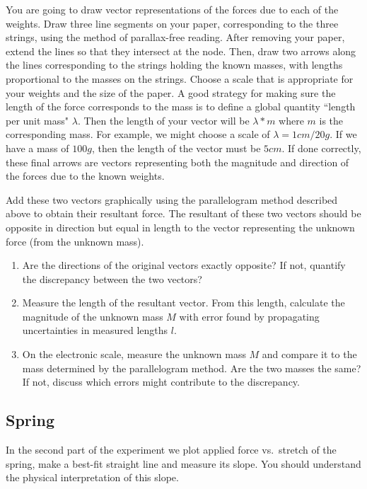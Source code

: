 You are going to draw vector representations of the forces due to each of the weights. Draw three line segments on your paper, corresponding to the three strings, using the method of parallax-free reading. After removing your paper, extend the lines so that they intersect at the node. Then, draw two arrows along the lines corresponding to the strings holding the known masses, with lengths proportional to the masses on the strings. Choose a scale that is appropriate for your weights and the size of the paper. A good strategy for making sure the length of the force corresponds to the mass is to define a global quantity ``length per unit mass" $\lambda$. Then the length of your vector will be $\lambda * m$ where $m$ is the corresponding mass.  For example, we might choose a scale of $\lambda = 1cm/20g$. If we have a mass of $100g$, then the length of the vector must be $5cm$. If done correctly, these final arrows are vectors representing both the magnitude and direction of the forces due to the known weights.\myskip

Add these two vectors graphically using the parallelogram method described above to obtain their resultant force. The resultant of these two vectors should be opposite in direction but equal in length to the vector representing the unknown force (from the unknown mass).

\begin{enumerate}
    \item Are the directions of the original vectors exactly opposite? If not, quantify the discrepancy between the two vectors?
    \item Measure the length of the resultant vector. From this length, calculate the magnitude of the unknown mass $M$ with error found by propagating uncertainties in measured lengths $l$.

\item On the electronic scale, measure the unknown mass $M$ and compare it to the mass determined by the parallelogram method. Are the two masses the  same?  If not, discuss which errors might contribute to the discrepancy.
\end{enumerate}

\subsection{Spring}

In the second part of the experiment we plot applied force vs.\ stretch of the spring, make a best-fit straight line and measure its slope. You should understand the physical interpretation of this slope. \myskip

